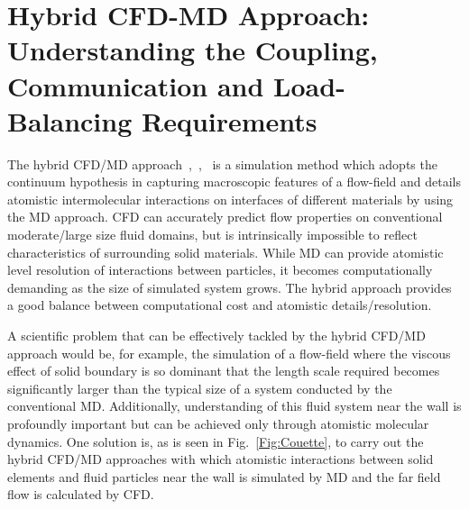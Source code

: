 \documentclass[conference,final]{IEEEtran}
\begin{document}

\section{Hybrid CFD-MD Approach: Understanding the Coupling, Communication and Load-Balancing Requirements}

The hybrid CFD/MD approach~\cite{Thompson},~\cite{Nie},~\cite{Yen} is
a simulation method which adopts the continuum hypothesis in capturing
macroscopic features of a flow-field and details atomistic
intermolecular interactions on interfaces of different materials by
using the MD approach. CFD can accurately predict flow properties on
conventional moderate/large size fluid domains, but is intrinsically
impossible to reflect characteristics of surrounding solid materials.
While MD can provide atomistic level resolution of interactions
between particles, it becomes computationally demanding as the size of
simulated system grows. The hybrid approach provides a good balance
between computational cost and atomistic details/resolution.


A scientific problem that can be effectively tackled by the hybrid
CFD/MD approach would be, for example, the simulation of a flow-field
where the viscous effect of solid boundary is so dominant that the
length scale required becomes significantly larger than the typical
size of a system conducted by the conventional MD. Additionally,
understanding of this fluid system near the wall is profoundly
important but can be achieved only through atomistic molecular
dynamics. One solution is, as is seen in Fig.~\ref{Fig:Couette}, to
carry out the hybrid CFD/MD approaches with which atomistic
interactions between solid elements and fluid particles near the wall
is simulated by MD and the far field flow is calculated by CFD.
\end{document}

